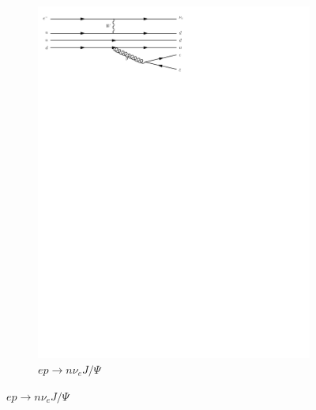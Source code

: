 \begin{figure}[h]
\begin{subfigure}[b]{0.3\textwidth}
    \includegraphics[trim={0.5cm 22cm 10cm 0cm},width=\textwidth]{../Diagrams/D18.pdf}
    \caption{$ep\rightarrow n\nu_eJ/\Psi$}
    \label{fey:18}
  \end{subfigure}%
\end{figure}
